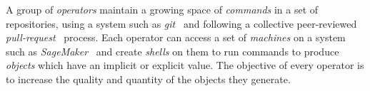 A group of \emph{operators} maintain a growing space of \emph{commands} in a set of repositories, using a system such as \emph{git}~\cite{git} and following a collective peer-reviewed \emph{pull-request}~\cite{pull_request} process. Each operator can access a set of \emph{machines} on a system such as \emph{SageMaker}~\cite{sagemaker} and create \emph{shells} on them to run commands to produce \emph{objects} which have an implicit or explicit value. The objective of every operator is to increase the quality and quantity of the objects they generate.
